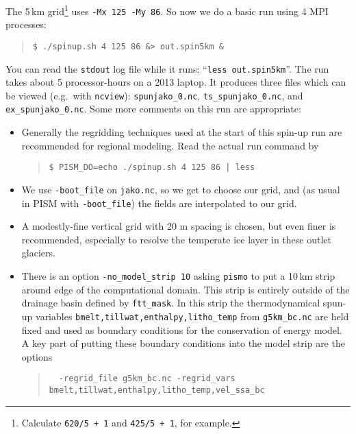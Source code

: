 The 5\,km grid\footnote{Calculate \texttt{620/5 + 1} and \texttt{425/5 + 1}, for example.} uses \verb|-Mx 125 -My 86|.  So now we do a basic run using 4 MPI processes:
\begin{quote}\small
\begin{verbatim}
$ ./spinup.sh 4 125 86 &> out.spin5km &
\end{verbatim}
\normalsize\end{quote}
You can read the \texttt{stdout} log file while it runs: ``\verb|less out.spin5km|''.  The run takes about 5 processor-hours on a 2013 laptop.   %
It produces three files which can be viewed (e.g.~with \verb|ncview|): \verb|spunjako_0.nc|, \verb|ts_spunjako_0.nc|, and \verb|ex_spunjako_0.nc|.  Some more comments on this run are appropriate:
\begin{itemize}
\item Generally the regridding techniques used at the start of this spin-up run are recommended for regional modeling.  Read the actual run command by
\begin{quote}\small
\begin{verbatim}
$ PISM_DO=echo ./spinup.sh 4 125 86 | less
\end{verbatim}
\normalsize\end{quote}
\item  We use \verb|-boot_file| on \verb|jako.nc|, so we get to choose our grid, and (as usual in PISM with \verb|-boot_file|) the fields are interpolated to our grid.
\item A modestly-fine vertical grid with 20 m spacing is chosen, but even finer is recommended, especially to resolve the temperate ice layer in these outlet glaciers.
\item There is an option \verb|-no_model_strip 10| asking \verb|pismo| to put a 10\,km strip around edge of the computational domain.  This strip is entirely outside of the drainage basin defined by \verb|ftt_mask|.  In this strip the thermodynamical spun-up variables \verb|bmelt,tillwat,enthalpy,litho_temp| from \verb|g5km_bc.nc| are held fixed and used as boundary conditions for the conservation of energy model.  A key part of putting these boundary conditions into the model strip are the options
\begin{quote}\small
\begin{verbatim}
  -regrid_file g5km_bc.nc -regrid_vars bmelt,tillwat,enthalpy,litho_temp,vel_ssa_bc
\end{verbatim}
\normalsize\end{quote}

\end{itemize}
